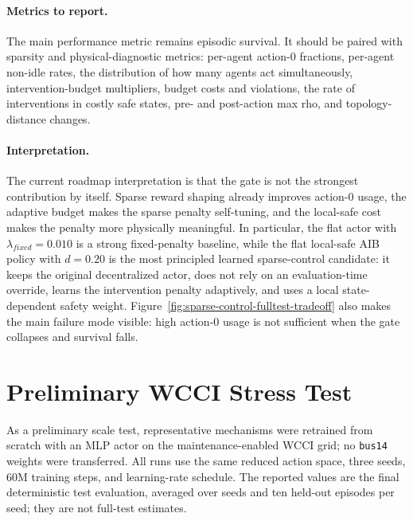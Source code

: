 \paragraph{Metrics to report.}
The main performance metric remains episodic survival. It should be paired with
sparsity and physical-diagnostic metrics: per-agent action-0 fractions,
per-agent non-idle rates, the distribution of how many agents act
simultaneously, intervention-budget multipliers, budget costs and violations,
the rate of interventions in costly safe states, pre- and post-action max rho,
and topology-distance changes.

\paragraph{Interpretation.}
The current roadmap interpretation is that the gate is not the strongest
contribution by itself. Sparse reward shaping already improves action-0 usage,
the adaptive budget makes the sparse penalty self-tuning, and the local-safe
cost makes the penalty more physically meaningful. In particular, the flat
actor with $\lambda_{fixed}=0.010$ is a strong fixed-penalty baseline, while
the flat local-safe AIB policy with $d=0.20$ is the most principled learned
sparse-control candidate: it keeps the original decentralized actor,
does not rely on an evaluation-time override, learns the intervention penalty
adaptively, and uses a local state-dependent safety weight.
Figure~\ref{fig:sparse-control-fulltest-tradeoff} also makes the main failure
mode visible: high action-0 usage is not sufficient when the gate collapses and
survival falls.


\section{Preliminary WCCI Stress Test}
\label{sec:sparse-wcci-stress-test}

As a preliminary scale test, representative mechanisms were retrained from
scratch with an MLP actor on the maintenance-enabled WCCI grid; no \texttt{bus14}
weights were transferred. All runs use the same reduced action space, three
seeds, 60M training steps, and learning-rate schedule. The reported values are
the final deterministic test evaluation, averaged over seeds and ten held-out
episodes per seed; they are not full-test estimates.

